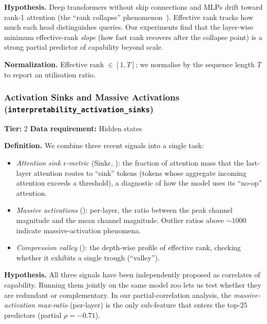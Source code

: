 \documentclass[preprint]{neurips_2025}
\begin{document}
\textbf{Hypothesis.} Deep transformers without skip connections and MLPs drift toward rank-1 attention (the ``rank collapse'' phenomenon~\citep{dong2021attention}). Effective rank tracks how much each head distinguishes queries. Our experiments find that the layer-wise minimum effective-rank \emph{slope} (how fast rank recovers after the collapse point) is a strong partial predictor of capability beyond scale.

\textbf{Normalization.} Effective rank $\in [1, T]$; we normalise by the sequence length $T$ to report an utilisation ratio.

\subsubsection{Activation Sinks and Massive Activations (\texttt{interpretability\_activation\_sinks})}
\label{app:activation-sinks}

\textbf{Tier:} 2 \quad \textbf{Data requirement:} Hidden states

\textbf{Definition.} We combine three recent signals into a single task:
\begin{itemize}[leftmargin=*]
  \item \emph{Attention sink $\epsilon$-metric} (Sink$\epsilon$, \citet{gu2025attentionsinks}): the fraction of attention mass that the last-layer attention routes to ``sink'' tokens (tokens whose aggregate incoming attention exceeds a threshold), a diagnostic of how the model uses its ``no-op'' attention.
  \item \emph{Massive activations} (\citet{sun2024massiveactivations}): per-layer, the ratio between the peak channel magnitude and the mean channel magnitude. Outlier ratios above $\sim 1000$ indicate massive-activation phenomena.
  \item \emph{Compression valley} (\citet{pedrotti2025compressionvalley}): the depth-wise profile of effective rank, checking whether it exhibits a single trough (``valley'').
\end{itemize}

\textbf{Hypothesis.} All three signals have been independently proposed as correlates of capability. Running them jointly on the same model zoo lets us test whether they are redundant or complementary. In our partial-correlation analysis, the \emph{massive-activation max-ratio} (per-layer) is the only sub-feature that enters the top-$25$ predictors (partial $\rho = -0.71$).
\end{document}
